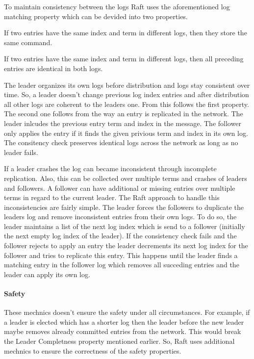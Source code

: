 To maintain consistency between the logs Raft uses the aforementioned
log matching property which can be devided into two properties.

\begin{defi}
  If two entries have the same index and term in different logs, then
  they store the same command.
\end{defi}

\begin{defi}
  If two entries have the same index and term in different logs, then
  all preceding entries are identical in both logs.
\end{defi}

The leader organizes its own logs before distribution and logs stay
consistent over time. So, a leader doesn't change previous log index
entries and after distribution all other logs are coherent to the leaders
one. From this follows the first property. The second one follows
from the way an entry is replicated in the network. The leader
inlcudes the previous entry term and index in the message. The follower only
applies the entry if it finds the given privious term and index in its
own log. The consitency check preserves identical logs across the
network as long as no leader fails.~\cite{ongaro2014search}

If a leader crashes the log can became inconsistent through incomplete
replication. Also, this can be collected over multiple terms and
crashes of leaders and followers. A follower can have additional
or missing entries over multiple terms in regard to the current leader.
The Raft approach to handle this inconsistencies are fairly simple.
The leader forces the followers to duplicate the leaders log and
remove inconsistent entries from their own logs. 
To do so, the leader maintains a list of the next log index
which is send to a follower (initially the next empty log index of the leader). 
If the consistency check fails and the follower rejects to apply
an entry the leader decrements its next log index for the follower
and tries to replicate this entry. This happens until the leader
finds a matching entry in the follower log which removes all
succeding entries and the leader can apply its own log.~\cite{ongaro2014search}

\paragraph{Safety}
These mechnics doesn't ensure the safety under all circumstances.
For example, if a leader is elected which has a shorter log
then the leader before the new leader maybe removes already
committed entries from the network. This would break the
Leader Completness property mentioned earlier. So, Raft
uses additional mechnics to ensure the correctness of
the safety properties.~\cite{ongaro2014search}

